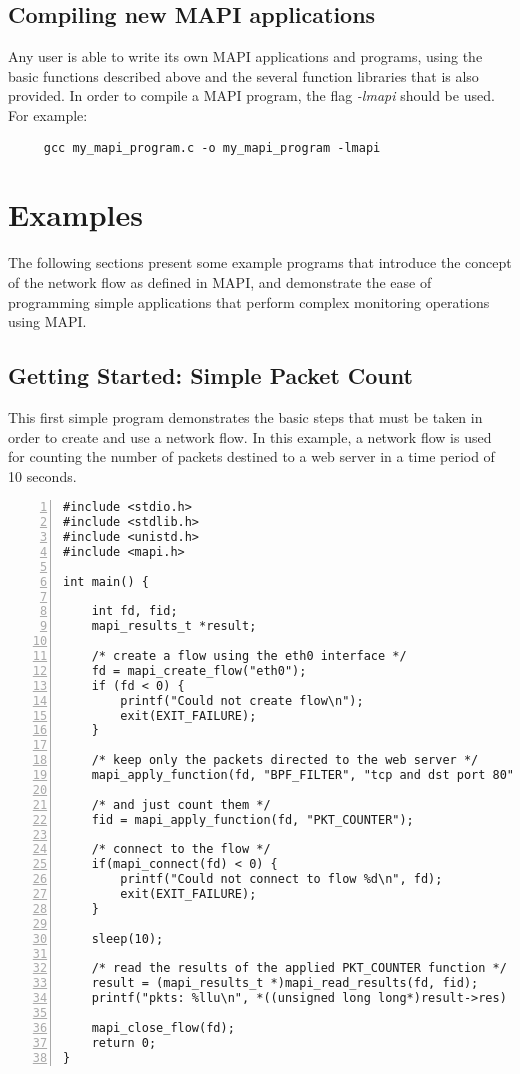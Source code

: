 \documentclass[a4paper, 11pt]{article}
\begin{document}
\subsection{Compiling new MAPI applications}

Any user is able to write its own MAPI applications and programs, using the basic
functions described above and the several function libraries that is also provided.
In order to compile a MAPI program, the flag \textit{-lmapi} should be used.
For example:

\begin{verbatim}
     gcc my_mapi_program.c -o my_mapi_program -lmapi
\end{verbatim}


\section{Examples}

The following sections present some example programs
that introduce the concept of the network flow as defined in MAPI,
and demonstrate the ease of programming simple applications that perform
complex monitoring operations using MAPI.

\subsection{Getting Started: Simple Packet Count}

This first simple program demonstrates the basic steps that must be taken
in order to create and use a network flow. In this example, a network
flow is used for counting the number of packets destined to a web server
in a time period of 10 seconds.

\begin{Verbatim}[numbersep=12pt, numbers=left, baselinestretch=1.0, fontsize=\small]
#include <stdio.h>
#include <stdlib.h>
#include <unistd.h>
#include <mapi.h>

int main() {

    int fd, fid;
    mapi_results_t *result;

    /* create a flow using the eth0 interface */
    fd = mapi_create_flow("eth0");
    if (fd < 0) {
        printf("Could not create flow\n");
        exit(EXIT_FAILURE);
    }

    /* keep only the packets directed to the web server */
    mapi_apply_function(fd, "BPF_FILTER", "tcp and dst port 80");
    
    /* and just count them */
    fid = mapi_apply_function(fd, "PKT_COUNTER");

    /* connect to the flow */
    if(mapi_connect(fd) < 0) {
        printf("Could not connect to flow %d\n", fd);
        exit(EXIT_FAILURE);
    }
    
    sleep(10);
    
    /* read the results of the applied PKT_COUNTER function */
    result = (mapi_results_t *)mapi_read_results(fd, fid);
    printf("pkts: %llu\n", *((unsigned long long*)result->res) );
    
    mapi_close_flow(fd);
    return 0;
}
\end{Verbatim}
\end{document}
